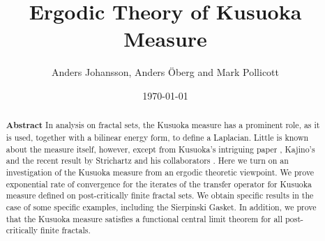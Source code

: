\documentclass[11pt]{scrartcl}
\theoremstyle{plain} %
\theoremstyle{definition}
\begin{document}
\title{Ergodic Theory of Kusuoka Measure} 
\author{Anders Johansson, Anders \"Oberg and Mark Pollicott}
\date{\today} 
\maketitle
\begin{abstract}
\noindent
{\bf Abstract}\newline
\noindent
In analysis on fractal sets, the Kusuoka measure has a prominent role, as it is used, together with a bilinear energy form, to define a Laplacian. Little is known about the measure itself, however, except from Kusuoka's intriguing paper \cite{kusuoka2}, Kajino's \cite{kajino} and the recent result by Strichartz and his collaborators \cite{str3}. Here we turn on an investigation of the Kusuoka measure from an ergodic theoretic viewpoint. We prove exponential rate of convergence for the iterates of the transfer operator for Kusuoka measure defined on post-critically finite fractal sets. We obtain specific results in the case of some specific examples, including the Sierpinski Gasket. In addition, we prove that the Kusuoka measure satisfies a functional central limit theorem for all post-critically finite fractals. 
\end{abstract}
\end{document}
